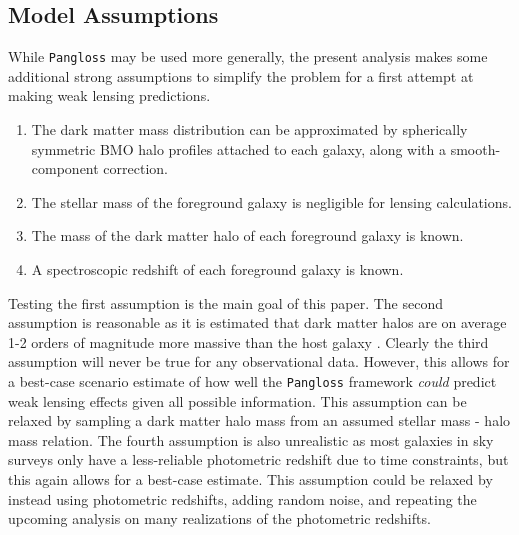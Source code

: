 \documentclass[%
 reprint,
 amsmath,amssymb,
 aps,nofootinbib
]{revtex4-1}
\begin{document}
\subsection{Model Assumptions}
While \texttt{Pangloss} may be used more generally, the present analysis makes some additional strong assumptions to simplify the problem for a first attempt at making weak lensing predictions.

\begin{enumerate}
\item The dark matter mass distribution can be approximated by spherically symmetric BMO halo profiles attached to each galaxy, along with a smooth-component correction.
\item The stellar mass of the foreground galaxy is negligible for lensing calculations.
\item The mass of the dark matter halo of each foreground galaxy is known.
\item A spectroscopic redshift of each foreground galaxy is known.
\end{enumerate}

Testing the first assumption is the main goal of this paper. The second assumption is reasonable as it is estimated that dark matter halos are on average 1-2 orders of magnitude more massive than the host galaxy \cite{smhr}. Clearly the third assumption will never be true for any observational data. However, this allows for a best-case scenario estimate of how well the \texttt{Pangloss} framework \textit{could} predict weak lensing effects given all possible information. This assumption can be relaxed by sampling a dark matter halo mass from an assumed stellar mass - halo mass relation. The fourth assumption is also unrealistic as most galaxies in sky surveys only have a less-reliable photometric redshift due to time constraints, but this again allows for a best-case estimate. This assumption could be relaxed by instead using photometric redshifts, adding random noise, and repeating the upcoming analysis on many realizations of the photometric redshifts.


\end{document}

